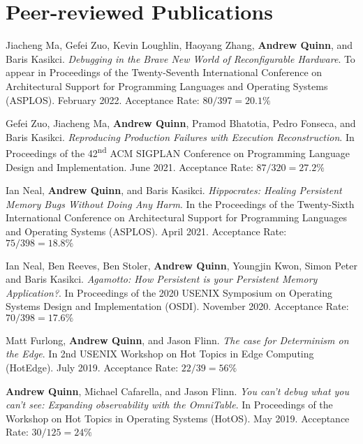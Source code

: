 \documentclass[letterpaper,10pt]{article}
\newcommand{\paper}[3]{#1. #2 #3}
\begin{document}
\section{Peer-reviewed Publications}
\begin{smenumerate}
    \item \paper{Jiacheng Ma, Gefei Zuo, Kevin Loughlin, Haoyang
      Zhang, \textbf{Andrew Quinn}, and Baris Kasikci}{\emph{Debugging
      in the Brave New World of Reconfigurable Hardware}. To appear in
      Proceedings of the Twenty-Seventh International Conference on
      Architectural Support for Programming Languages and Operating
      Systems (ASPLOS). February 2022.}{Acceptance Rate:
      $80/397=20.1\%$}

  \item \paper{Gefei Zuo, Jiacheng Ma, \textbf{Andrew Quinn}, Pramod
    Bhatotia, Pedro Fonseca, and Baris Kasikci}{\emph{Reproducing
    Production Failures with Execution Reconstruction}. In Proceedings
    of the 42\textsuperscript{nd} ACM SIGPLAN Conference on
    Programming Language Design and Implementation. June
    2021.}{Acceptance Rate: $87/320=27.2\%$}

  \item \paper{Ian Neal, \textbf{Andrew Quinn}, and Baris
    Kasikci}{\emph{Hippocrates: Healing Persistent Memory Bugs Without
    Doing Any Harm}. In the Proceedings of the Twenty-Sixth
    International Conference on Architectural Support for Programming
    Languages and Operating Systems (ASPLOS). April 2021.}{Acceptance
    Rate: $75/398=18.8\%$}
    
  \item \paper{Ian Neal, Ben Reeves, Ben Stoler, \textbf{Andrew Quinn}, Youngjin Kwon,
    Simon Peter and Baris Kasikci}{\emph{Agamotto: How Persistent is your
    Persistent Memory Application?}.  In Proceedings of the 2020 USENIX
    Symposium on Operating Systems Design and Implementation (OSDI).  November
    2020.}{Acceptance Rate: $70/398=17.6\%$}

  \item \paper{Matt Furlong, \textbf{Andrew Quinn}, and Jason Flinn}
    {\emph{The case for Determinism on the Edge}.  In 2nd USENIX
      Workshop on Hot Topics in Edge Computing (HotEdge).  July
      2019.}{Acceptance Rate: $22/39=56\%$}

  \item \paper{\textbf{Andrew Quinn}, Michael Cafarella, and Jason
    Flinn}{\emph{You can't debug what you can't see: Expanding
    observability with the OmniTable}. In Proceedings of the Workshop
    on Hot Topics in Operating Systems (HotOS).  May 2019.}{Acceptance
    Rate: $30/125=24\%$}


\end{smenumerate}
\end{document}
